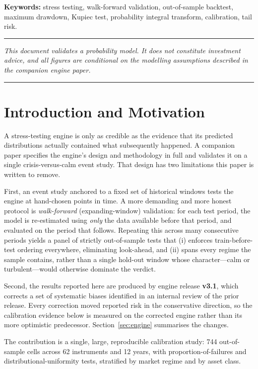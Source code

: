 \documentclass[11pt]{article}
\begin{document}
\noindent\textbf{Keywords:} stress testing, walk-forward validation, out-of-sample
backtest, maximum drawdown, Kupiec test, probability integral transform,
calibration, tail risk.

\smallskip
\hrule\vspace{0.3em}
{\small\itshape This document validates a probability model. It does not constitute
investment advice, and all figures are conditional on the modelling assumptions
described in the companion engine paper.}
\vspace{0.3em}\hrule

\clearpage
\tableofcontents
\clearpage

\section{Introduction and Motivation}

A stress-testing engine is only as credible as the evidence that its predicted
distributions actually contained what subsequently happened. A companion paper
specifies the engine's design and methodology in full and validates it on a
single crisis-versus-calm event study. That design has two limitations this paper
is written to remove.

First, an event study anchored to a fixed set of historical windows tests the
engine at hand-chosen points in time. A more demanding and more honest protocol
is \emph{walk-forward} (expanding-window) validation: for each test period, the
model is re-estimated using \emph{only} the data available before that period,
and evaluated on the period that follows. Repeating this across many consecutive
periods yields a panel of strictly out-of-sample tests that (i) enforces
train-before-test ordering everywhere, eliminating look-ahead, and (ii) spans
every regime the sample contains, rather than a single hold-out window whose
character---calm or turbulent---would otherwise dominate the verdict.

Second, the results reported here are produced by engine release \textbf{v3.1},
which corrects a set of systematic biases identified in an internal review of the
prior release. Every correction moved reported risk in the conservative
direction, so the calibration evidence below is measured on the corrected engine
rather than its more optimistic predecessor. Section~\ref{sec:engine} summarises
the changes.

The contribution is a single, large, reproducible calibration study: 744
out-of-sample cells across 62 instruments and 12 years, with proportion-of-failures
and distributional-uniformity tests, stratified by market regime and by asset
class.
\end{document}
